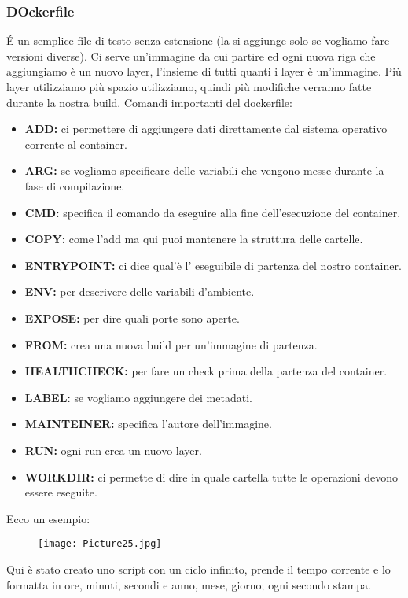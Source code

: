 \documentclass[a4paper,12pt]{article}
\begin{document}
\subsubsection{DOckerfile}
\'{E} un semplice file di testo senza estensione (la si aggiunge solo se vogliamo fare versioni diverse). Ci serve un'immagine da cui partire ed ogni nuova riga che aggiungiamo è un nuovo layer, l'insieme di tutti quanti i layer è un'immagine. 
Più layer utilizziamo più spazio utilizziamo, quindi più modifiche verranno fatte durante la nostra build.
\newline
Comandi importanti del dockerfile:
\begin{itemize}
    \item \textbf{ADD: }ci permettere di aggiungere dati direttamente dal sistema operativo corrente al container.
    \item \textbf{ARG: }se vogliamo specificare delle variabili che vengono messe durante la fase di compilazione.
    \item \textbf{CMD: }specifica il comando da eseguire alla fine dell'esecuzione del container.
    \item \textbf{COPY: }come l'add ma qui puoi mantenere la struttura delle cartelle.
    \item \textbf{ENTRYPOINT: }ci dice qual'è l' eseguibile di partenza del nostro container.
    \item \textbf{ENV: }per descrivere delle variabili d'ambiente.
    \item \textbf{EXPOSE: }per dire quali porte sono aperte.
    \item \textbf{FROM: }crea una nuova build per un'immagine di partenza.
    \item \textbf{HEALTHCHECK: }per fare un check prima della partenza del container.
    \item \textbf{LABEL: }se vogliamo aggiungere dei metadati.
    \item \textbf{MAINTEINER: }specifica l'autore dell'immagine.
    \item \textbf{RUN: }ogni run crea un nuovo layer.
    \item \textbf{WORKDIR: }ci permette di dire in quale cartella tutte le operazioni devono essere eseguite.
\end{itemize}
\newpage
Ecco un esempio:
\begin{figure}[H]
    \centering
    \texttt{[image: Picture25.jpg]}
    \label{etichetta47}
\end{figure}
\noindent Qui è stato creato uno script con un ciclo infinito, prende il tempo corrente e lo formatta in ore, minuti, secondi e anno, mese, giorno; ogni secondo stampa.
\end{document}
